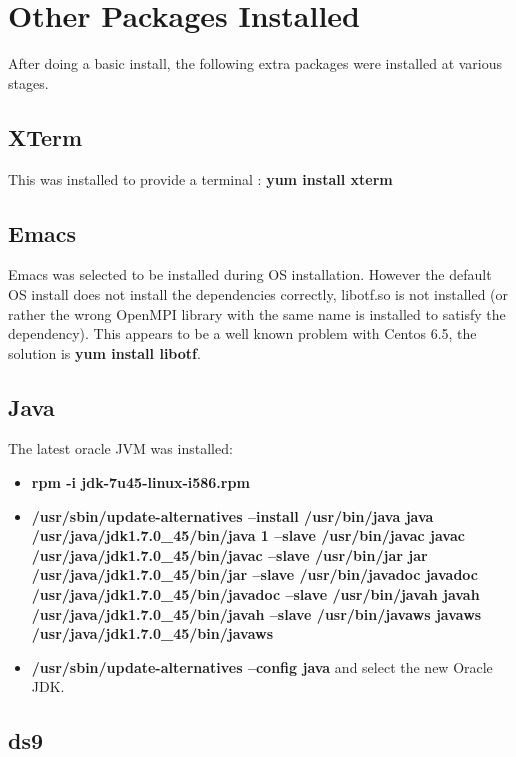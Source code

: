 \documentclass[10pt,a4paper]{article}
\begin{document}
\section{Other Packages Installed}

After doing a basic install, the following extra packages were installed at various stages.

\subsection{XTerm}

This was installed to provide a terminal : {\bf yum install xterm}

\subsection{Emacs}

Emacs was selected to be installed during OS installation. However the default OS install does not install the dependencies correctly, libotf.so is not installed (or rather the wrong OpenMPI library with the same name is installed to satisfy the dependency). This appears to be a well known problem with Centos 6.5, the solution is {\bf yum install libotf}.

\subsection{Java}

The latest oracle JVM was installed: 

\begin{itemize}
\item {\bf rpm -i jdk-7u45-linux-i586.rpm}
\item {\bf/usr/sbin/update-alternatives --install /usr/bin/java java /usr/java/jdk1.7.0\_45/bin/java 1 --slave /usr/bin/javac javac /usr/java/jdk1.7.0\_45/bin/javac --slave /usr/bin/jar jar /usr/java/jdk1.7.0\_45/bin/jar --slave /usr/bin/javadoc javadoc /usr/java/jdk1.7.0\_45/bin/javadoc --slave /usr/bin/javah javah /usr/java/jdk1.7.0\_45/bin/javah --slave /usr/bin/javaws javaws /usr/java/jdk1.7.0\_45/bin/javaws}
\item {\bf/usr/sbin/update-alternatives --config java} and select the new Oracle JDK.
\end{itemize}

\subsection{ds9}
\end{document}

